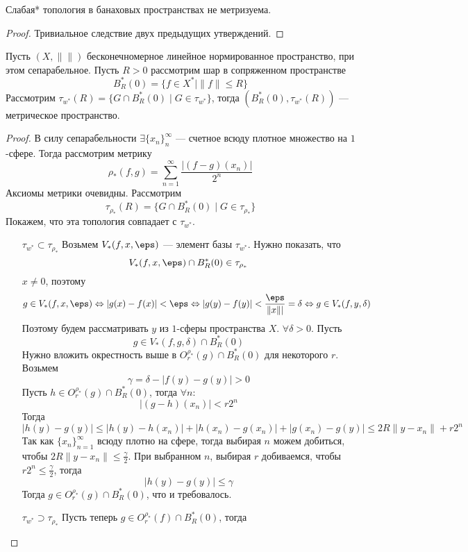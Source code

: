 \begin{theorem}
	Слабая* топология в банаховых пространствах не метризуема.
\end{theorem}
\begin{proof}
	Тривиальное следствие двух предыдущих утверждений. 
\end{proof}

\begin{claim}
	Пусть $(X, \|\|)$ бесконечномерное линейное нормированное пространство, при этом сепарабельное. Пусть $ R > 0$ рассмотрим шар в сопряженном пространстве 
	$$
	B_R^*(0) = \{f \in X^* \mid \|f\| \leq R\}
	$$
	Рассмотрим $\tau_{w^*}(R) = \{G \cap B_R^*(0) \mid G \in \tau_{w^*}\}$, тогда $(B_R^*(0), \tau_{w^*}(R))$ --- метрическое пространство.
\end{claim}
\begin{proof}
	В силу сепарабельности $\exists \{x_n\}_n^\infty$ --- счетное всюду плотное множество на $1$-сфере. Тогда рассмотрим метрику 
	$$
	\rho_*(f,g) = \sum_{n=1}^{\infty} \frac{|(f-g)(x_n)|}{2^n}
	$$
	Аксиомы метрики очевидны. Рассмотрим 
	$$
	\tau_{\rho_*}(R) = \{G \cap B_R^*(0) \mid G \in \tau_{\rho_*}\}
	$$
	Покажем, что эта топология совпадает с $\tau_{w^*}$.
	\begin{enumerate}
		\item[$\tau_{w^*} \subset \tau_{\rho_*}$] Возьмем $V_*(f,x,\eps)$ --- элемент базы $\tau_{w^*}$. Нужно показать, что 
		$$
		V_*(f,x,\eps) \cap B_R^*(0)  \in \tau_{\rho_*}
		$$
		$x \neq 0$, поэтому 
		$$
		g \in V_*(f,x,\eps) \Leftrightarrow |g(x) - f(x)| < \eps \Leftrightarrow |g(y) - f(y)| < \frac{\eps}{\|x\||} = \delta \Leftrightarrow g \in V_*(f,y,\delta)
		$$
		Поэтому будем рассматривать $y$ из $1$-сферы пространства $X$. $\forall \delta > 0$. Пусть 
		$$
		g\in V_*(f,g,\delta) \cap B_R^*(0) 
		$$
		Нужно вложить окрестность выше в $O_r^{\rho_*}(g) \cap B_R^*(0)$ для некоторого $r$. Возьмем 
		$$
		\gamma = \delta - |f(y) - g(y)| > 0
		$$
		Пусть $h \in O_r^{\rho_*}(g) \cap B_R^*(0)$, тогда $\forall n$:
		$$
		|(g-h)(x_n)| < r 2^n
		$$
		Тогда 
		$$
		|h(y) - g(y) | \leq |h(y) - h(x_n)| + |h(x_n) - g(x_n)| + |g(x_n) - g(y)| \leq 2R\|y - x_n\| + r2^n 
		$$
		Так как $\{x_n\}_{n=1}^\infty$ всюду плотно на сфере, тогда выбирая $n$ можем добиться, чтобы $2R\|y - x_n\| \leq \frac{\gamma}{2}$. При выбранном $n$, выбирая $r$ добиваемся, чтобы $r2^n \leq \frac{\gamma}{2}$, тогда
		$$
		|h(y) - g(y)| \leq \gamma
		$$
		Тогда $g \in  O_r^{\rho_*}(g) \cap B_R^*(0)$, что и требовалось.
		\item[$\tau_{w^*} \supset \tau_{\rho_*}$] Пусть теперь $ g \in O_r^{\rho_*}(f) \cap B_R^*(0)$, тогда 

\end{enumerate}
\end{proof}
